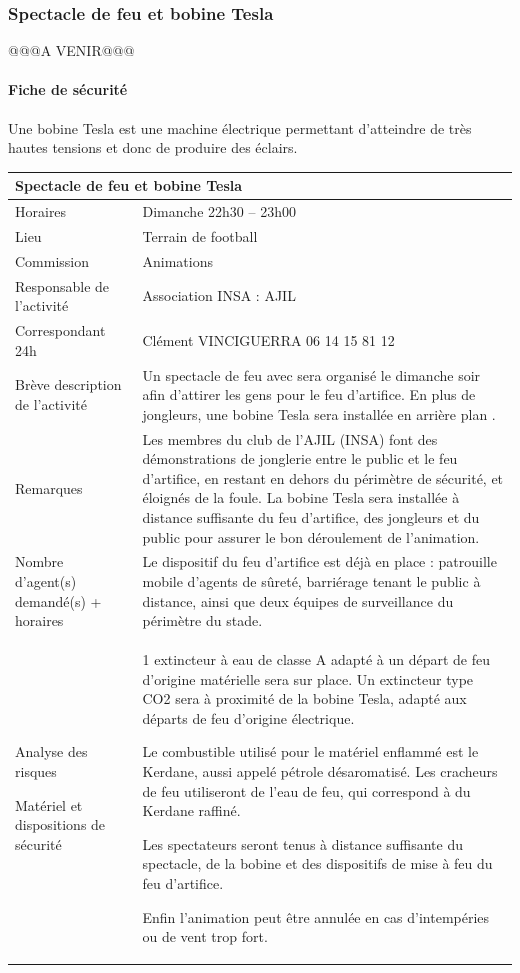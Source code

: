 \documentclass[hidelinks, paper=a4, fontsize=13pt]{report}
\begin{document}
\newpage

\subsubsection{Spectacle de feu et bobine Tesla}
@@@A VENIR@@@

\paragraph{Fiche de sécurité}
Une bobine Tesla est une machine électrique permettant d'atteindre de très hautes tensions et donc de produire des éclairs.
\begin{center}

\begin{tabular}{ | p{6cm} | p{10cm} | }
\hline
	\multicolumn{2}{|l|}{Spectacle de feu et bobine Tesla}  \\ \hline
	Horaires & Dimanche 22h30 – 23h00 \\ \hline
	Lieu & Terrain de football \\ \hline
	Commission & Animations \\ \hline
	Responsable de l'activité & Association INSA : AJIL \\ \hline
	Correspondant 24h & Clément VINCIGUERRA 06 14 15 81 12 \\ \hline
	Brève description de l'activité & Un spectacle de feu avec sera organisé le dimanche soir afin d’attirer les gens pour le feu d’artifice. En plus de jongleurs, une bobine Tesla sera installée en arrière plan . \\ \hline
	Remarques & Les membres du club de l’AJIL (INSA) font des démonstrations de jonglerie entre le public et le feu d’artifice, en restant en dehors du périmètre de sécurité, et éloignés de la foule. La bobine Tesla sera installée à distance suffisante du feu d'artifice, des jongleurs et du public pour assurer le bon déroulement de l'animation.\\ \hline
	Nombre d’agent(s) demandé(s) + horaires
 & Le dispositif du feu d’artifice est déjà en place : patrouille mobile d’agents de sûreté, barriérage tenant le public à distance, ainsi que deux équipes de surveillance du périmètre du stade. \\ \hline
Analyse des risques

Matériel et dispositions de sécurité & 1 extincteur à eau de classe A adapté à un départ de feu d'origine matérielle sera sur place. Un extincteur type CO2 sera à proximité de la bobine Tesla, adapté aux départs de feu d'origine électrique.

Le combustible utilisé pour le matériel enflammé est le Kerdane, aussi appelé pétrole désaromatisé. Les cracheurs de feu utiliseront de l'eau de feu, qui correspond à du Kerdane raffiné. 

Les spectateurs seront tenus à distance suffisante du spectacle, de la bobine et des dispositifs de mise à feu du feu d’artifice.

Enfin l’animation peut être annulée en cas d’intempéries ou de vent trop fort. \\ \hline
\end{tabular}
\end{center}
\end{document}
